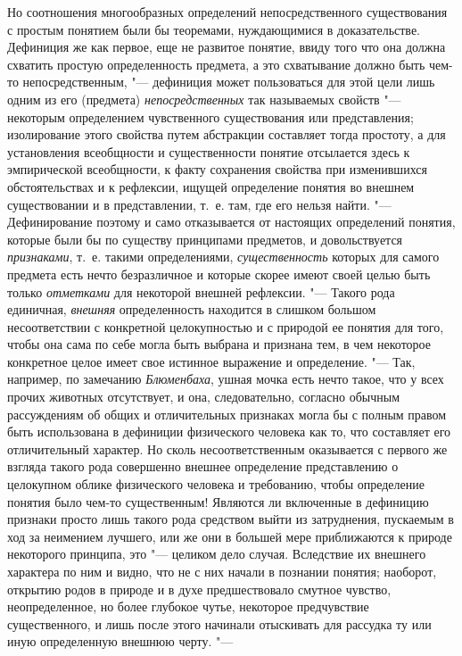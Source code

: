 {{Но соотношения многообразных определений непосредственного
существования с простым понятием были бы теоремами, нуждающимися в
доказательстве. Дефиниция же как первое, еще не развитое понятие, ввиду
того что она должна схватить простую определенность предмета, а это
схватывание должно быть чем-то непосредственным, "--- дефиниция
может пользоваться для этой цели лишь одним из его (предмета)
{\em непосредственных}
так называемых свойств "--- некоторым
определением чувственного существования или представления; изолирование
этого свойства путем абстракции составляет тогда простоту, а для
установления всеобщности и существенности понятие отсылается здесь к
эмпирической всеобщности, к факту сохранения свойства при изменившихся
обстоятельствах и к рефлексии, ищущей определение понятия во внешнем
существовании и в представлении, т.~е. там, где его нельзя найти. "---
Дефинирование поэтому и само отказывается от настоящих
определений понятия, которые были бы по существу принципами предметов, и
довольствуется {\em признаками},
т.~е. такими определениями,
{\em существенность}
которых для самого предмета есть нечто безразличное и которые
скорее имеют своей целью быть только
{\em отметками} для
некоторой внешней рефлексии. "--- Такого рода единичная,
{\em внешняя}
определенность находится в слишком большом несоответствии с
конкретной целокупностью и с природой ее понятия для того, чтобы она сама
по себе могла быть выбрана и признана тем, в чем некоторое конкретное целое
имеет свое истинное выражение и определение. "--- Так,
например, по замечанию
{\em Блюменбаха}, ушная
мочка есть нечто такое, что у всех прочих животных отсутствует, и она,
следовательно, согласно обычным рассуждениям об общих и
отличительных признаках могла бы с полным правом быть
использована в дефиниции физического человека как то, что составляет его
отличительный характер. Но сколь несоответственным оказывается с первого же
взгляда такого рода совершенно внешнее определение представлению о
целокупном облике физического человека и требованию, чтобы определение
понятия было чем-то существенным! Являются ли включенные в дефиницию
признаки просто лишь такого рода средством выйти из затруднения, пускаемым
в ход за неимением лучшего, или же они в большей мере приближаются к
природе некоторого принципа, это "--- целиком дело случая.
Вследствие их внешнего характера по ним и видно, что не с них начали в
познании понятия; наоборот, открытию родов в природе и в духе
предшествовало смутное чувство, неопределенное, но более глубокое чутье,
некоторое предчувствие существенного, и лишь после этого начинали
отыскивать для рассудка ту или иную определенную внешнюю черту. "---
}}
